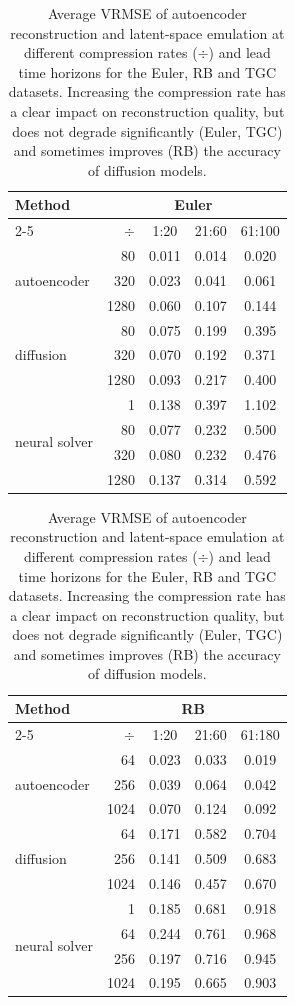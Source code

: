 \begin{subappendices}
\begin{table}[!h]
    \centering
    \caption{Average VRMSE of autoencoder reconstruction and latent-space emulation at different compression rates ($\div$) and lead time horizons for the Euler, RB and TGC datasets. Increasing the compression rate has a clear impact on reconstruction quality, but does not degrade significantly (Euler, TGC) and sometimes improves (RB) the accuracy of diffusion models.}
    \footnotesize
    \begin{tabular}{lrccc}
        \toprule
        \multirow[c]{2}{*}{Method} & \multicolumn{4}{c}{Euler} \\
        \cmidrule(lr){2-5}
         & $\div$ & 1:20 & 21:60 & 61:100 \\
        \midrule
        \multirow[c]{3}{*}{autoencoder}
        & 80 & 0.011 & 0.014 & 0.020 \\
        & 320 & 0.023 & 0.041 & 0.061 \\
        & 1280 & 0.060 & 0.107 & 0.144 \\
        \midrule
        \multirow[c]{3}{*}{diffusion}
        & 80 & 0.075 & 0.199 & 0.395 \\
        & 320 & 0.070 & 0.192 & 0.371 \\
        & 1280 & 0.093 & 0.217 & 0.400 \\
        \midrule
        \multirow[c]{4}{*}{neural solver}
        & 1 & 0.138 & 0.397 & 1.102 \\
        & 80 & 0.077 & 0.232 & 0.500 \\
        & 320 & 0.080 & 0.232 & 0.476 \\
        & 1280 & 0.137 & 0.314 & 0.592 \\
        \bottomrule
    \end{tabular}
    \hspace{1em}
    \begin{tabular}{lrccc}
        \toprule
        \multirow[c]{2}{*}{Method} & \multicolumn{4}{c}{RB} \\
        \cmidrule(lr){2-5}
         & $\div$ & 1:20 & 21:60 & 61:180 \\
        \midrule
        \multirow[c]{3}{*}{autoencoder}
        & 64   & 0.023 & 0.033 & 0.019 \\
        & 256  & 0.039 & 0.064 & 0.042 \\
        & 1024 & 0.070 & 0.124 & 0.092 \\
        \midrule
        \multirow[c]{3}{*}{diffusion}
        & 64   & 0.171 & 0.582 & 0.704 \\
        & 256  & 0.141 & 0.509 & 0.683 \\
        & 1024 & 0.146 & 0.457 & 0.670 \\
        \midrule
        \multirow[c]{4}{*}{neural solver}
        & 1    & 0.185 & 0.681 & 0.918 \\
        & 64   & 0.244 & 0.761 & 0.968 \\
        & 256  & 0.197 & 0.716 & 0.945 \\
        & 1024 & 0.195 & 0.665 & 0.903 \\
        \bottomrule
    \end{tabular}


\end{table}
\end{subappendices}
